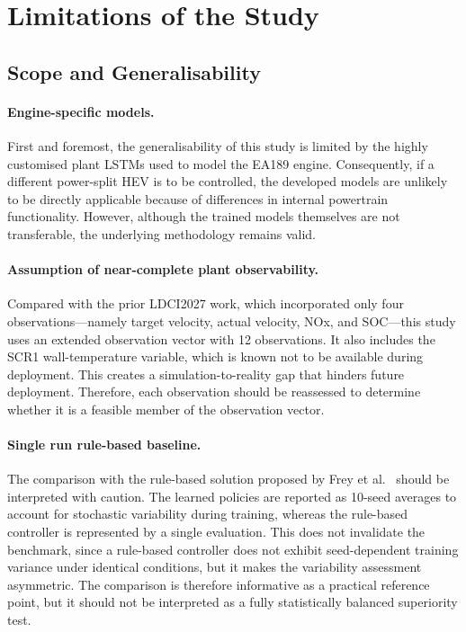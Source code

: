 \section{Limitations of the Study}
\label{sec:limitations_of_the_study}

\subsection{Scope and Generalisability}
\label{subsec:discussion_scope_generalisability}

\paragraph{Engine-specific models.} First and foremost, the generalisability of this study is limited by the highly customised plant \ac{LSTM}s used to model the EA189 engine. Consequently, if a different power-split \ac{HEV} is to be controlled, the developed models are unlikely to be directly applicable because of differences in internal powertrain functionality. However, although the trained models themselves are not transferable, the underlying methodology remains valid.

\paragraph{Assumption of near-complete plant observability.} Compared with the prior LDCI2027 work, which incorporated only four observations---namely target velocity, actual velocity, \ac{NOx}, and \ac{SOC}---this study uses an extended observation vector with 12 observations. It also includes the SCR1 wall-temperature variable, which is known not to be available during deployment. This creates a simulation-to-reality gap that hinders future deployment. Therefore, each observation should be reassessed to determine whether it is a feasible member of the observation vector.

\paragraph{Single run rule-based baseline.} The comparison with the rule-based solution proposed by Frey et al.\ \cite{frey_data-based_2025} should be interpreted with caution. The learned policies are reported as 10-seed averages to account for stochastic variability during training, whereas the rule-based controller is represented by a single evaluation. This does not invalidate the benchmark, since a rule-based controller does not exhibit seed-dependent training variance under identical conditions, but it makes the variability assessment asymmetric. The comparison is therefore informative as a practical reference point, but it should not be interpreted as a fully statistically balanced superiority test.

